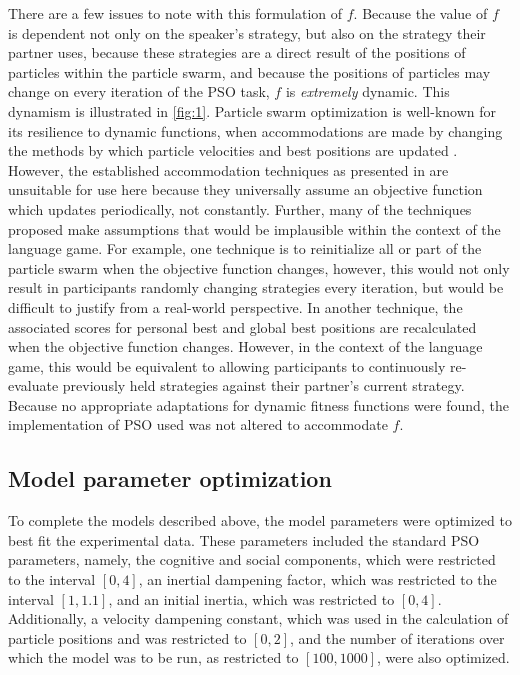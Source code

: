 \documentclass[12pt,a4paper]{article}
\begin{document}
There are a few issues to note with this formulation of $f$. Because the value of $f$ is dependent not only on the speaker's strategy, but also on the strategy their partner uses, because these strategies are a direct result of the positions of particles within the particle swarm, and because the positions of particles may change on every iteration of the PSO task, $f$ is \textit{extremely} dynamic. This dynamism is illustrated in \autoref{fig:1}. Particle swarm optimization is well-known for its resilience to dynamic functions, when accommodations are made by changing the methods by which particle velocities and best positions are updated \citep{engelbrecht2005}. However, the established accommodation techniques as presented in \cite{engelbrecht2005} are unsuitable for use here because they universally assume an objective function which updates periodically, not constantly. 
Further, many of the techniques proposed make assumptions that would be implausible within the context of the \citeauthor{rohde2012} language game. For example, one technique is to reinitialize all or part of the particle swarm when the objective function changes, however, this would not only result in participants randomly changing strategies every iteration, but would be difficult to justify from a real-world perspective. In another technique, the associated scores for personal best and global best positions are recalculated when the objective function changes. However, in the context of the language game, this would be equivalent to allowing participants to continuously re-evaluate previously held strategies against their partner's current strategy. Because no appropriate adaptations for dynamic fitness functions were found, the implementation of PSO used was not altered to accommodate $f$.

\subsection{Model parameter optimization}
To complete the models described above, the model parameters were optimized to best fit the experimental data. These parameters included the standard PSO parameters, namely, the cognitive and social components, which were restricted to the interval $[0,4]$, an inertial dampening factor, which was restricted to the interval $[1,1.1]$, and an initial inertia, which was restricted to $[0,4]$. Additionally, a velocity dampening constant, which was used in the calculation of particle positions and was restricted to $[0,2]$, and the number of iterations over which the model was to be run, as restricted to $[100,1000]$, were also optimized.
\end{document}
